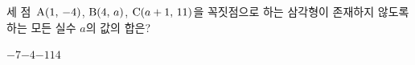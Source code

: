 세 점~$\mathrm{A}(1,\,-4)$, $\mathrm{B}(4,\,a)$, $\mathrm{C}(a+1,\,11)$을 꼭짓점으로 하는 삼각형이 존재하지 않도록 하는 모든 실수 $a$의 값의 합은?
\begin{choices32}{$-7$}{$-4$}{$-1$}{$1$}{$4$}\end{choices32}
